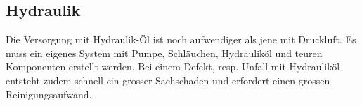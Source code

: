 \subsection{Hydraulik}
Die Versorgung mit Hydraulik-Öl ist noch aufwendiger als jene mit Druckluft. Es muss ein eigenes System mit Pumpe, Schläuchen, Hydrauliköl und teuren Komponenten erstellt werden. Bei einem Defekt, resp. Unfall mit Hydrauliköl entsteht zudem schnell ein grosser Sachschaden und erfordert einen grossen Reinigungsaufwand. 

